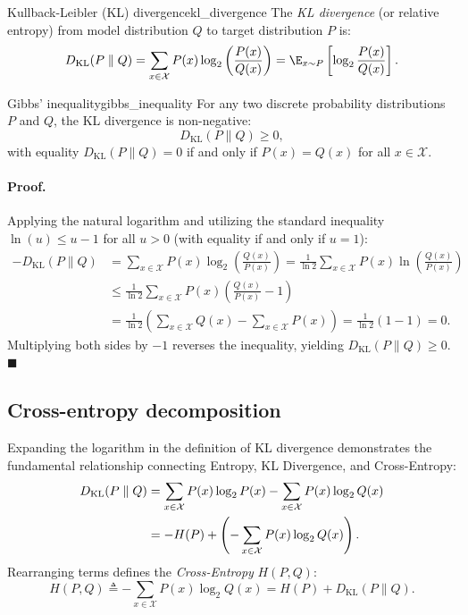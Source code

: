 \documentclass[../../main.tex]{subfiles}
\begin{document}
\begin{definition}{Kullback-Leibler (KL) divergence}{kl_divergence}
The \emph{KL divergence} (or relative entropy) from model distribution $Q$ to target distribution $P$ is:
\begin{equation}
\label{eq:kl_divergence}
D_{\text{KL}}(P \parallel Q) = \sum_{x \in \mathcal{X}} P(x) \log_2 \left( \frac{P(x)}{Q(x)} \right) = \E_{x \sim P}\left[ \log_2 \frac{P(x)}{Q(x)} \right].
\end{equation}
\end{definition}

\begin{theorem}{Gibbs' inequality}{gibbs_inequality}
For any two discrete probability distributions $P$ and $Q$, the KL divergence is non-negative:
\begin{equation}
\label{eq:gibbs_ineq}
D_{\text{KL}}(P \parallel Q) \ge 0,
\end{equation}
with equality $D_{\text{KL}}(P \parallel Q) = 0$ if and only if $P(x) = Q(x)$ for all $x \in \mathcal{X}$.
\end{theorem}

\paragraph{Proof.}
Applying the natural logarithm and utilizing the standard inequality $\ln(u) \le u - 1$ for all $u > 0$ (with equality if and only if $u = 1$):
\begin{align*}
- D_{\text{KL}}(P \parallel Q) &= \sum_{x \in \mathcal{X}} P(x) \log_2 \left( \frac{Q(x)}{P(x)} \right) = \frac{1}{\ln 2} \sum_{x \in \mathcal{X}} P(x) \ln \left( \frac{Q(x)}{P(x)} \right) \\
&\le \frac{1}{\ln 2} \sum_{x \in \mathcal{X}} P(x) \left( \frac{Q(x)}{P(x)} - 1 \right) \\
&= \frac{1}{\ln 2} \left( \sum_{x \in \mathcal{X}} Q(x) - \sum_{x \in \mathcal{X}} P(x) \right) = \frac{1}{\ln 2} (1 - 1) = 0.
\end{align*}
Multiplying both sides by $-1$ reverses the inequality, yielding $D_{\text{KL}}(P \parallel Q) \ge 0$. \hfill $\blacksquare$

\subsection{Cross-entropy decomposition}
Expanding the logarithm in the definition of KL divergence demonstrates the fundamental relationship connecting Entropy, KL Divergence, and Cross-Entropy:
\begin{align}
D_{\text{KL}}(P \parallel Q) &= \sum_{x \in \mathcal{X}} P(x) \log_2 P(x) - \sum_{x \in \mathcal{X}} P(x) \log_2 Q(x) \notag \\
&= - H(P) + \left( - \sum_{x \in \mathcal{X}} P(x) \log_2 Q(x) \right). \label{eq:kl_expanded}
\end{align}
Rearranging terms defines the \emph{Cross-Entropy} $H(P, Q)$:
\begin{equation}
\label{eq:cross_entropy_decomp}
H(P, Q) \triangleq - \sum_{x \in \mathcal{X}} P(x) \log_2 Q(x) = H(P) + D_{\text{KL}}(P \parallel Q).
\end{equation}
\end{document}
